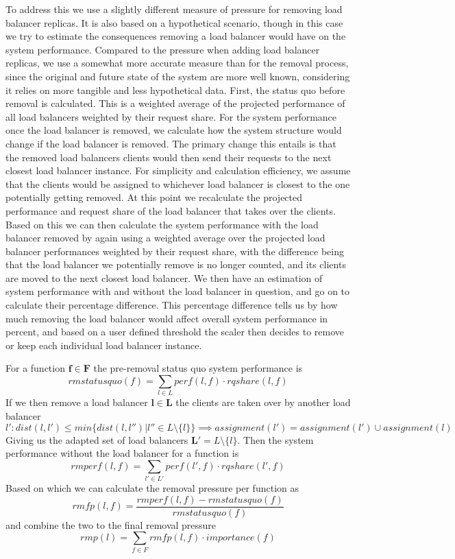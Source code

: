 To address this we use a slightly different measure of pressure for removing load balancer replicas.
It is also based on a hypothetical scenario, though in this case we try to estimate the consequences removing a load balancer would have on the system performance.
Compared to the pressure when adding load balancer replicas, we use a somewhat more accurate measure than for the removal process, since the original and future state of the system are more well known, considering it relies on more tangible and less hypothetical data.
First, the status quo before removal is calculated.
This is a weighted average of the projected performance of all load balancers weighted by their request share.
For the system performance once the load balancer is removed, we calculate how the system structure would change if the load balancer is removed.
The primary change this entails is that the removed load balancers clients would then send their requests to the next closest load balancer instance.
For simplicity and calculation efficiency, we assume that the clients would be assigned to whichever load balancer is closest to the one potentially getting removed.
At this point we recalculate the projected performance and request share of the load balancer that takes over the clients.
Based on this we can then calculate the system performance with the load balancer removed by again using a weighted average over the projected load balancer performances weighted by their request share, with the difference being that the load balancer we potentially remove is no longer counted, and its clients are moved to the next closest load balancer.
We then have an estimation of system performance with and without the load balancer in question, and go on to calculate their percentage difference.
This percentage difference tells us by how much removing the load balancer would affect overall system performance in percent, and based on a user defined threshold the scaler then decides to remove or keep each individual load balancer instance.


For a function $\mathbf{f \in F}$ the pre-removal status quo system performance is
\[rmstatusquo(f) = \sum_{l \in L}perf(l,f) \cdot rqshare(l,f)\]
If we then remove a load balancer $\mathbf{l \in L}$ the clients are taken over by another load balancer
\[l': dist(l,l') \leq min\{dist(l,l'') | l'' \in L \setminus \{l\}\} \implies assignment(l') = assignment(l') \cup assignment(l)\]
Giving us the adapted set of load balancers $\mathbf{L'} = L \setminus \{l\}$. Then the system performance without the load balancer for a function is
\[rmperf(l,f) = \sum_{l' \in L'}perf(l',f) \cdot rqshare(l',f) \]
Based on which we can calculate the removal pressure per function as
\[ rmfp(l,f) = \frac{rmperf(l,f) - rmstatusquo(f)}{rmstatusquo(f)}\]
and combine the two to the final removal pressure
\[rmp(l) = \sum_{f \in F}rmfp(l,f) \cdot importance(f)\]


